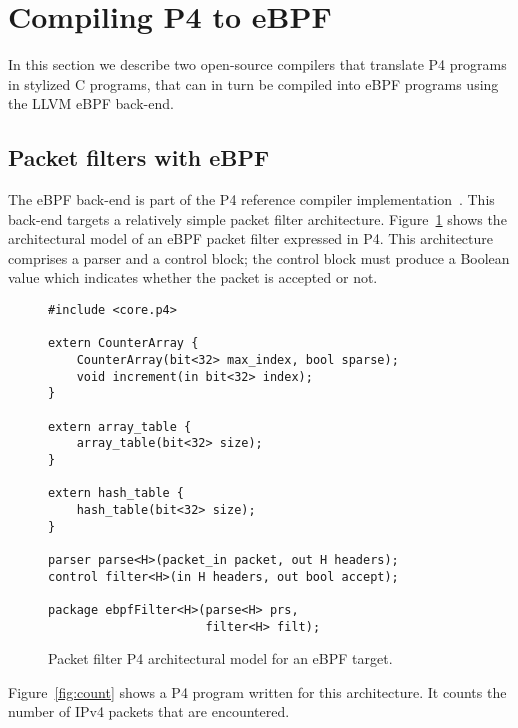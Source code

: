\section{Compiling P4 to eBPF}\label{sec:compilation}

In this section we describe two open-source compilers that translate
P4 programs in stylized C programs, that can in turn be compiled into
eBPF programs using the LLVM eBPF back-end.


\subsection{Packet filters with eBPF}\label{sec:ebpf}

The eBPF back-end is part of the P4 reference compiler
implementation~\cite{p4-ebpf-backend}.  This back-end targets a
relatively simple packet filter architecture.
Figure~\ref{fig:ebpf-model} shows the architectural model of an eBPF
packet filter expressed in P4.  This architecture comprises a parser
and a control block; the control block must produce a Boolean value
which indicates whether the packet is accepted or not.

\begin{figure}[h]
\begin{lstlisting}
#include <core.p4>

extern CounterArray {
    CounterArray(bit<32> max_index, bool sparse);
    void increment(in bit<32> index);
}

extern array_table {
    array_table(bit<32> size);
}

extern hash_table {
    hash_table(bit<32> size);
}

parser parse<H>(packet_in packet, out H headers);
control filter<H>(in H headers, out bool accept);

package ebpfFilter<H>(parse<H> prs,
                      filter<H> filt);
\end{lstlisting}
\caption{Packet filter P4 architectural model for an eBPF
  target.}\label{fig:ebpf-model}
\end{figure}

Figure~\ref{fig:count} shows a P4 program written for this
architecture. It counts the number of IPv4 packets that are
encountered.

